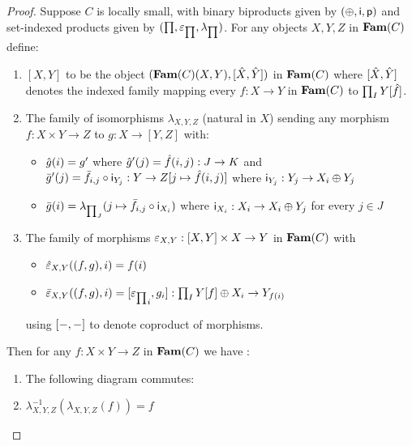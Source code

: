 \begin{proof}
Suppose $C$ is locally small, with binary biproducts given by $(\oplus,\mathsf{i},\mathsf{p})$ and set-indexed products
given by $(\prod,\varepsilon_{\prod},\lambda_{\prod})$. For any objects $X, Y, Z$ in $\mathbf{Fam}(C)$ define:

\begin{enumerate}
\item $[X, Y]$ to be the object $(\mathbf{Fam}(C)(X,Y),[\hat{X}, \hat{Y}])$ in $\mathbf{Fam}(C)$ where $[\hat{X}, \hat{Y}]$
denotes the indexed family mapping every $f: X \to Y$ in $\mathbf{Fam}(C)$ to $\prod_{I}Y[\hat{f}]$.
\item The family of isomorphisms $\lambda_{X,Y,Z}$ (natural in $X$) sending any morphism $f: X \times Y \to Z$
to $g: X \to [Y, Z]$ with:
\begin{itemize}
\item $\hat{g}(i) = g'$ where $\hat{g}'(j) = \hat{f}(i, j): J \to K$ and $\bar{g}'(j) = \bar{f}_{i,j} \circ
\mathsf{i}_{Y_j}: Y \to Z[j \mapsto \hat{f}(i, j)]$ where $\mathsf{i}_{Y_j}: Y_j \to X_i \oplus Y_j$
\item $\bar{g}(i) = \lambda_{\prod_{J}}(j \mapsto \bar{f}_{i, j} \circ \mathsf{i}_{X_i})$ where $\mathsf{i}_{X_i}: X_i
\to X_i \oplus Y_j$ for every $j \in J$
\end{itemize}
\item The family of morphisms $\varepsilon_{X,Y}: [X, Y] \times X \to Y$ in $\mathbf{Fam}(C)$ with
\begin{itemize}
\item $\hat{\varepsilon}_{X,Y}((f, g), i) = f(i)$
\item $\bar{\varepsilon}_{X,Y}((f, g), i) = [{\varepsilon_{\prod}}_i, g_i]: \prod_{I}Y[f] \oplus X_i \to Y_{f(i)}$
\end{itemize}
using $[-, -]$ to denote coproduct of morphisms.
\end{enumerate}
Then for any $f: X \times Y \to Z$ in $\mathbf{Fam}(C)$ we have :
\begin{enumerate}
\item The following diagram commutes:

\begin{center}
\end{center}

\item $\lambda^{-1}_{X,Y,Z}(\lambda_{X,Y,Z}(f)) = f$
\end{enumerate}
\end{proof}
